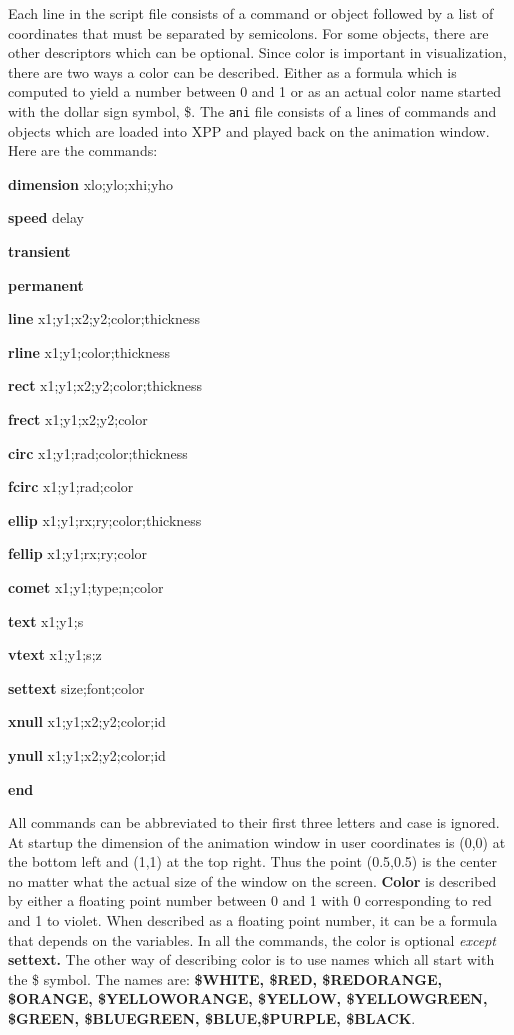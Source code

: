 \documentclass{article}
\begin{document}
Each line in the script file consists of a command or object followed
by a list of coordinates that must be separated by semicolons. For
some objects, there are other descriptors which can be optional.
Since color is important in visualization, there are two ways a color
can be described. Either as a formula which is computed to yield a
number between 0 and 1 or as an actual color name started with the
dollar sign symbol, \$. The {\tt ani} file consists of a lines of
commands and objects which are loaded into XPP and played back on the
animation window. Here are the commands:
\begin{description}
\item{\bf dimension} xlo;ylo;xhi;yho
\item{\bf speed} delay
\item{\bf transient}
\item{\bf permanent}
\item{\bf line} x1;y1;x2;y2;color;thickness
\item{\bf rline} x1;y1;color;thickness
\item{\bf rect} x1;y1;x2;y2;color;thickness
\item{\bf frect} x1;y1;x2;y2;color
\item{\bf circ} x1;y1;rad;color;thickness
\item{\bf fcirc} x1;y1;rad;color
\item{\bf ellip} x1;y1;rx;ry;color;thickness
\item{\bf fellip} x1;y1;rx;ry;color
\item{\bf comet} x1;y1;type;n;color
\item{\bf text} x1;y1;s
\item{\bf vtext} x1;y1;s;z
\item{\bf settext} size;font;color
\item{\bf xnull} x1;y1;x2;y2;color;id
\item{\bf ynull} x1;y1;x2;y2;color;id
\item{\bf end}
\end{description}

All commands can be abbreviated to their first three letters and case
is ignored. At startup the dimension of the animation window in user
coordinates is (0,0) at the bottom left and (1,1) at the top
right. Thus the point (0.5,0.5) is the center no matter what the
actual size of the window on the screen.  {\bf Color} is described by either
a floating point number between 0 and 1 with 0 corresponding to red
and 1 to violet. When described as a floating point number, it can be
a formula that depends on the variables. In all the commands, the
color is optional {\em except} {\bf settext.}  The other way of
describing color is to use names which all start with the \$
symbol. The names are:
{\bf \$WHITE, \$RED, \$REDORANGE, \$ORANGE, \$YELLOWORANGE,
                    \$YELLOW, \$YELLOWGREEN, \$GREEN, \$BLUEGREEN,
		      \$BLUE,\$PURPLE, \$BLACK}.
\end{document}

